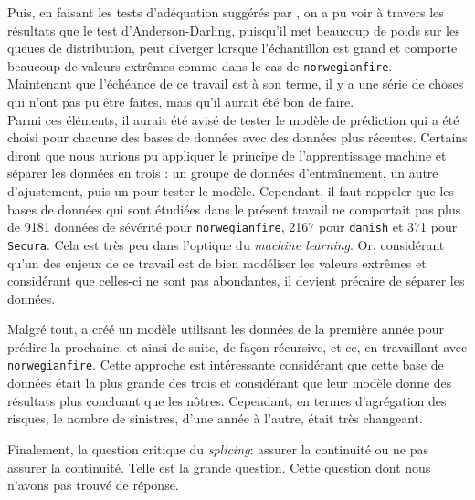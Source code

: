 	Puis, en faisant les tests d'adéquation suggérés par \cite{LossModels_Klugman2012}, on a pu voir à travers les résultats que le test d'Anderson-Darling, puisqu'il met beaucoup de poids sur les queues de distribution, peut diverger lorsque l'échantillon est grand et comporte beaucoup de valeurs extrêmes comme dans le cas de \texttt{norwegianfire}.\\
	
	Maintenant que l'échéance de ce travail est à son terme, il y a une série de choses qui n'ont pas pu être faites, mais qu'il aurait été bon de faire. \\
	
	Parmi ces éléments, il aurait été avisé de tester le modèle de prédiction qui a été choisi pour chacune des bases de données avec des données plus récentes. Certains diront que nous aurions pu appliquer le principe de l'apprentissage machine et séparer les données en trois : un groupe de données d'entraînement, un autre d'ajustement, puis un pour tester le modèle. Cependant, il faut rappeler que les bases de données qui sont étudiées dans le présent travail ne comportait pas plus de 9181 données de sévérité pour \texttt{norwegianfire}, 2167 pour \texttt{danish} et 371 pour \texttt{Secura}. Cela est très peu dans l'optique du \textit{machine learning}. Or, considérant qu'un des enjeux de ce travail est de bien modéliser les valeurs extrêmes et considérant que celles-ci ne sont pas abondantes, il devient précaire de séparer les données.\\
	
	\begin{sloppypar}
		Malgré tout, \cite{brazauskas2016modeling} a créé un modèle utilisant les données de la première année pour prédire la prochaine, et ainsi de suite, de façon récursive, et ce, en travaillant avec \texttt{norwegianfire}. Cette approche est intéressante considérant que cette base de données était la plus grande des trois et considérant que leur modèle donne des résultats plus concluant que les nôtres. Cependant, en termes d'agrégation des risques, le nombre de sinistres, d'une année à l'autre, était très changeant.\\
	\end{sloppypar}

	Finalement, la question critique du \textit{splicing}: assurer la continuité ou ne pas assurer la continuité. Telle est la grande question. Cette question dont nous n'avons pas trouvé de réponse.
	 